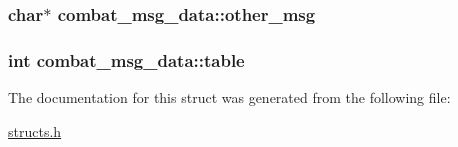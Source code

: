 \hypertarget{structcombat__msg__data_a4bbb926f07588b7cd4d71febf58a63de}{
\subsubsection[{other\-\_\-msg}]{\setlength{\rightskip}{0pt plus 5cm}char$\ast$ combat\-\_\-msg\-\_\-data\-::other\-\_\-msg}}\label{structcombat__msg__data_a4bbb926f07588b7cd4d71febf58a63de}
\hypertarget{structcombat__msg__data_a1eb0e986dc3309bcbdee77ec531f9cae}{
\subsubsection[{table}]{\setlength{\rightskip}{0pt plus 5cm}int combat\-\_\-msg\-\_\-data\-::table}}\label{structcombat__msg__data_a1eb0e986dc3309bcbdee77ec531f9cae}


The documentation for this struct was generated from the following file\-:\begin{DoxyCompactItemize}
\item 
\hyperlink{structs_8h}{structs.\-h}\end{DoxyCompactItemize}
